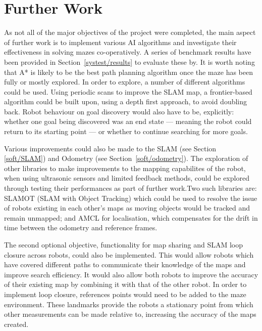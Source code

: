 
\chapter{Further Work}\label{furtherwork}
As not all of the major objectives of the project were completed, the main 
aspect of further work is to implement various AI algorithms and investigate 
their effectiveness in solving mazes co-operatively.  A series of benchmark 
results have been provided in Section~\ref{systest/results} to evaluate 
these by. It is worth noting that A* is likely to be the best path planning 
algorithm once the maze has been fully or mostly explored. In order to 
explore, a number of different algorithms could be used. Using periodic scans
to improve the SLAM map, a frontier-based algorithm could be built upon, using a 
depth first approach, to avoid doubling back. 
Robot behaviour on goal discovery would also have to be, explicitly: whether 
one goal being discovered was an end state --- meaning the robot could return 
to its starting point --- or whether to continue searching for more goals.
  
Various improvements could also be made to the SLAM (see Section~
\ref{soft/SLAM}) and Odometry (see Section~\ref{soft/odometry}).  
The exploration of other libraries to make improvements to the mapping 
capabilites of the robot, when using ultrasonic sensors and limited feedback 
methods, could be explored through testing their performances as part of
further work.Two such libraries are: SLAMOT (SLAM with Object Tracking) which 
could be used to resolve the issue of robots existing in each other's maps as 
moving objects would be tracked and remain unmapped; and AMCL for
localisation, which compensates for the drift in time between the odometry and 
reference frames.   

The second optional objective, functionality for map sharing and SLAM loop 
closure across robots, could also be implemented. This would allow robots which 
have covered different paths to communicate their knowledge of the maps and 
improve search efficiency. It would also allow both robots to improve the 
accuracy of their existing map by combining it with that of the other robot.
In order to implement loop closure, references points would need to be added
to the maze environment. These landmarks provide the robots a stationary point 
from which other measurements can be made relative to, increasing the accuracy 
of the maps created.

